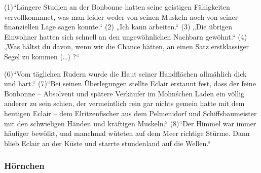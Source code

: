 {(1)“Längere Studien an der Bonbonne hatten seine geistigen Fähigkeiten vervollkommnet, was man leider weder von seinen Muskeln noch von seiner finanziellen Lage sagen konnte.“
(2) „Ich kann arbeiten.“
(3) „Die übrigen Einwohner hatten sich schnell an den ungewöhnlichen Nachbarn gewöhnt.“
(4) „Was hältst du davon, wenn wir die Chance hätten, an einen Satz erstklassiger Segel zu kommen (…) ?“


(6)“Vom täglichen Rudern wurde die Haut seiner Handflächen allmählich dick und hart.“
(7)“Bei seinen Überlegungen stellte Eclair erstaunt fest, dass der feine Bonbonne – Absolvent und spätere Verkäufer im Mohn\'schen Laden ein völlig anderer zu sein schien, der vermeintlich rein gar nichts gemein hatte mit dem heutigen Eclair – dem Elritzenfischer aus dem Pelmenidorf und Schiffsbaumeister mit den schwieligen Händen und kräftigen Muskeln.“
(8)“Der Himmel war immer häufiger bewölkt, und manchmal wüteten auf dem Meer richtige Stürme. Dann blieb Eclair an der Küste und starrte stundenland auf die Wellen.“


\subsubsection{Hörnchen}

}
